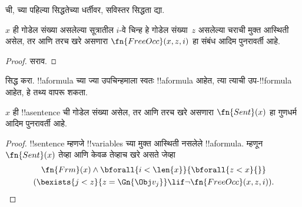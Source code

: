 \documentclass[../../../include/open-logic-section]{subfiles}
\begin{document}
\begin{prob}
 ची, 
 च्या पहिल्या सिद्धतेच्या
धर्तीवर, सविस्तर सिद्धता द्या.
\end{prob}

\begin{prop}
$x$ ही गोडेल संख्या असलेल्या सूत्रातील $i$-वे चिन्ह हे
गोडेल संख्या~$z$ असलेल्या चराची मुक्त आस्थिती असेल,
तर आणि तरच खरे असणारा $\fn{FreeOcc}(x, z, i)$ हा संबंध
आदिम पुनरावर्ती आहे.
\end{prop}

\begin{proof}
सराव.
\end{proof}

\begin{prob}
 सिद्ध करा.
!!a{formula} च्या ज्या उपचिन्हमाला स्वतः !!a{formula} आहेत,
त्या त्याची उप-!!{formula} आहेत, हे तथ्य वापरू शकता.
\end{prob}

\begin{prop}
$x$ ही !!a{sentence} ची गोडेल संख्या असेल, तर आणि तरच
खरे असणारा $\fn{Sent}(x)$ हा गुणधर्म आदिम पुनरावर्ती आहे.
\end{prop}

\begin{proof}
!!{sentence} म्हणजे !!{variable}s च्या मुक्त आस्थिती नसलेले
!!a{formula}. म्हणून $\fn{Sent}(x)$ तेव्हा आणि केवळ तेव्हाच खरे असते जेव्हा
\begin{multline*}
\fn{Frm}(x) \land \bforall{i<\len{x}}{\bforall{z<x}{}}\\
(\bexists{j<z}{z=\Gn{\Obj v_j}} \lif \lnot\fn{FreeOcc}(x,z,i)).
\end{multline*}
\end{proof}
\end{document}
